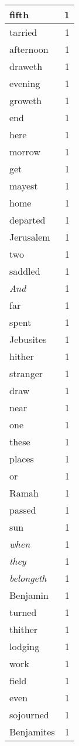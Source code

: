 \begin{center}
\begin{longtable}{l|r}
fifth & 1 \\ \hline
tarried & 1 \\ \hline
afternoon & 1 \\ \hline
draweth & 1 \\ \hline
evening & 1 \\ \hline
groweth & 1 \\ \hline
end & 1 \\ \hline
here & 1 \\ \hline
morrow & 1 \\ \hline
get & 1 \\ \hline
mayest & 1 \\ \hline
home & 1 \\ \hline
departed & 1 \\ \hline
Jerusalem & 1 \\ \hline
two & 1 \\ \hline
saddled & 1 \\ \hline
\emph{And} & 1 \\ \hline
far & 1 \\ \hline
spent & 1 \\ \hline
Jebusites & 1 \\ \hline
hither & 1 \\ \hline
stranger & 1 \\ \hline
draw & 1 \\ \hline
near & 1 \\ \hline
one & 1 \\ \hline
these & 1 \\ \hline
places & 1 \\ \hline
or & 1 \\ \hline
Ramah & 1 \\ \hline
passed & 1 \\ \hline
sun & 1 \\ \hline
\emph{when} & 1 \\ \hline
\emph{they} & 1 \\ \hline
\emph{belongeth} & 1 \\ \hline
Benjamin & 1 \\ \hline
turned & 1 \\ \hline
thither & 1 \\ \hline
lodging & 1 \\ \hline
work & 1 \\ \hline
field & 1 \\ \hline
even & 1 \\ \hline
sojourned & 1 \\ \hline
Benjamites & 1 \\ \hline

\end{longtable}
\end{center}
